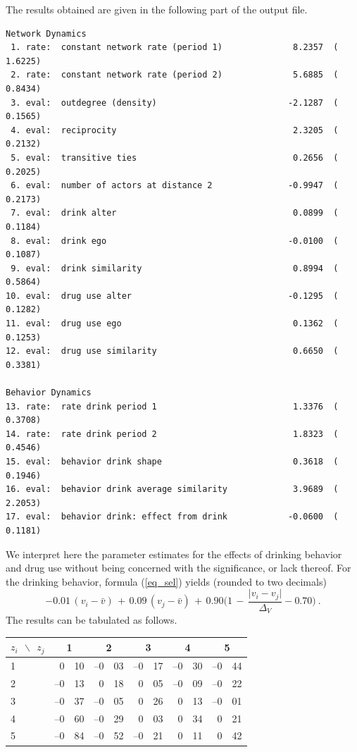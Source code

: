 \documentclass[a4paper,fleqn]{article}
\newcommand{\+}{\, + \,}
\newcommand{\mcc}[2]{\multicolumn{#1}{c}{#2}}
\newcommand{\separationb}{\\[0.5ex]\hline\rule{0pt}{2ex}}
\begin{document}
{The results obtained are given in the following
part of the output file.

\begin{verbatim}
Network Dynamics
 1. rate:  constant network rate (period 1)              8.2357  (   1.6225)
 2. rate:  constant network rate (period 2)              5.6885  (   0.8434)
 3. eval:  outdegree (density)                          -2.1287  (   0.1565)
 4. eval:  reciprocity                                   2.3205  (   0.2132)
 5. eval:  transitive ties                               0.2656  (   0.2025)
 6. eval:  number of actors at distance 2               -0.9947  (   0.2173)
 7. eval:  drink alter                                   0.0899  (   0.1184)
 8. eval:  drink ego                                    -0.0100  (   0.1087)
 9. eval:  drink similarity                              0.8994  (   0.5864)
10. eval:  drug use alter                               -0.1295  (   0.1282)
11. eval:  drug use ego                                  0.1362  (   0.1253)
12. eval:  drug use similarity                           0.6650  (   0.3381)

Behavior Dynamics
13. rate:  rate drink period 1                           1.3376  (   0.3708)
14. rate:  rate drink period 2                           1.8323  (   0.4546)
15. eval:  behavior drink shape                          0.3618  (   0.1946)
16. eval:  behavior drink average similarity             3.9689  (   2.2053)
17. eval:  behavior drink: effect from drink            -0.0600  (   0.1181)
\end{verbatim}

\noindent
We interpret here the parameter estimates for the effects of drinking behavior
and drug use without being concerned with the significance, or lack thereof.
For the drinking behavior, formula (\ref{eq_sel}) yields (rounded to two decimals)
\[
  -0.01 \, (v_i - \bar v) \,+\, 0.09 \, (v_j - \bar v) \,+\,
     0.90 \Big( 1 \, - \, \frac{\vert v_i - v_j \vert}{ \Delta_V }  - 0.70 \Big) \ .
\]
The results can be tabulated as follows.
\bigskip

\begin{center}
\begin{tabular}{l  r@{.}l  r@{.}l  r@{.}l  r@{.}l  r@{.}l }
$ z_i \ \  \backslash  \ \ z_j $   &  \mcc{2}{ 1} & \mcc{2}{ 2} & \mcc{2}{ 3} & \mcc{2}{ 4} &  \mcc{2}{ 5}
\separationb
 1        &    0&10    &  --0&03    &  --0&17    &  --0&30    &  --0&44   \\
 2        &  --0&13    &    0&18    &    0&05    &  --0&09    &  --0&22   \\
 3        &  --0&37    &  --0&05    &    0&26    &    0&13    &  --0&01   \\
 4        &  --0&60    &  --0&29    &    0&03    &    0&34    &    0&21   \\
 5        &  --0&84    &  --0&52    &  --0&21    &    0&11    &    0&42   \\
\hline
\end{tabular}
\end{center}


}
\end{document}
